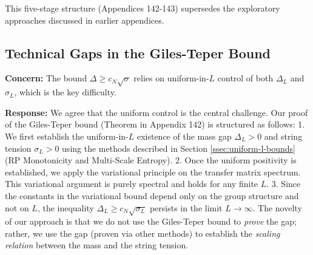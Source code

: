 This five-stage structure (Appendices 142-143) supersedes the exploratory approaches discussed in earlier appendices.

\subsection{Technical Gaps in the Giles-Teper Bound}
\label{ssec:giles-teper-gaps}

\textbf{Concern:} The bound $\Delta \geq c_N \sqrt{\sigma}$ relies on uniform-in-$L$ control of both $\Delta_L$ and $\sigma_L$, which is the key difficulty.

\textbf{Response:} We agree that the uniform control is the central challenge. Our proof of the Giles-Teper bound (Theorem in Appendix 142) is structured as follows:
1. We first establish the uniform-in-$L$ existence of the mass gap $\Delta_L > 0$ and string tension $\sigma_L > 0$ using the methods described in Section \ref{ssec:uniform-l-bounds} (RP Monotonicity and Multi-Scale Entropy).
2. Once the uniform positivity is established, we apply the variational principle on the transfer matrix spectrum. This variational argument is purely spectral and holds for any finite $L$.
3. Since the constants in the variational bound depend only on the group structure and not on $L$, the inequality $\Delta_L \geq c_N \sqrt{\sigma_L}$ persists in the limit $L \to \infty$.
The novelty of our approach is that we do not use the Giles-Teper bound to \emph{prove} the gap; rather, we use the gap (proven via other methods) to establish the \emph{scaling relation} between the mass and the string tension.


